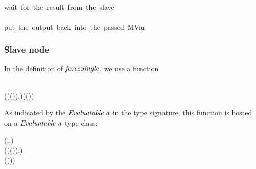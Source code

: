 \documentclass[paper=A4,twoside=true,openright,parskip=full,chapterprefix=true,headings=normal,bibliography=totoc,listof=totoc,titlepage=on,captions=tableabove,draft=false,british]{scrreprt}%
\begin{document}
\begin{hscode}
\\[\blanklineskip]%
\>[B]{}\<[3]%
\>[3]{}\mbox{\onelinecomment  wait for the result from the slave}{}\<[E]%
\\
\>[B]{}\<[3]%
\>[3]{}\leftarrow {}\;\<[E]%
\\[\blanklineskip]%
\>[B]{}\<[3]%
\>[3]{}\mbox{\onelinecomment  put the output back into the passed MVar}{}\<[E]%
\\
\>[B]{}\<[3]%
\>[3]{}\mathbin{\$}\;\;\<[E]%
\ColumnHook
\end{hscode}\resethooks

\hypertarget{slave-node}{%
\subsubsection{Slave node}\label{slave-node}}

\label{sec:cloudhaskellparEvalSlaveNode}

In the definition of \ensuremath{\Varid{forceSingle}}, we use a function


\begin{hscode}\SaveRestoreHook
{}%
%
%
\>[B]{}\mathbin{::}{}\<[E]%
\\
\>[B]{}\<[5]%
\>[5]{}(\;(\;(\;)),\;)\to {}\;(\;()){}\<[E]%
\ColumnHook
\end{hscode}\resethooks
\vspace{-2\baselineskip}

As indicated by the \ensuremath{\Conid{Evaluatable}\;\Varid{a}} in the type signature, this function
is hosted on a \ensuremath{\Conid{Evaluatable}\;\Varid{a}} type class:


\begin{hscode}\SaveRestoreHook
{}%
%
%
%
\>[B]{}\;(\;,\;,\;)\Rightarrow {}\;\;\<[E]%
\\
\>[B]{}\<[5]%
\>[5]{}\mathbin{::}(\;(\;(\;)),\;)\to {}\<[E]%
\\
\>[5]{}\<[9]%
\>[9]{}\;(\;()){}\<[E]%
\ColumnHook
\end{hscode}\resethooks
\vspace{-2\baselineskip}
\end{document}
